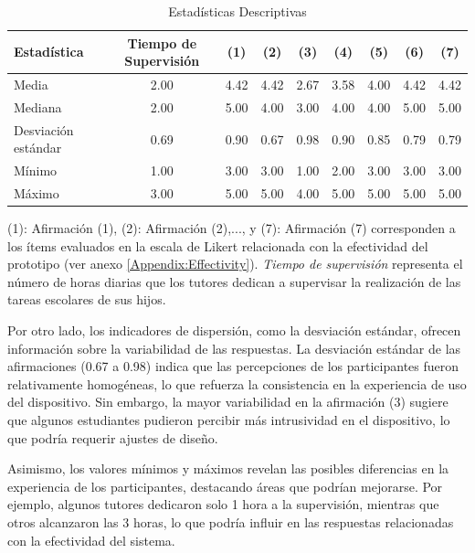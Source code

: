 				\begin{table}[h!]
				\centering
				\caption{Estadísticas Descriptivas}
				\begin{tabularx}{0.85\textwidth}{Xcccccccc}
					\toprule
					\textbf{Estadística} & \textbf{Tiempo de Supervisión} & \textbf{(1)} & \textbf{(2)} & \textbf{(3)} & \textbf{(4)} & \textbf{(5)} & \textbf{(6)} & \textbf{(7)} \\
					\midrule
					Media & 2.00 & 4.42 & 4.42 & 2.67 & 3.58 & 4.00 & 4.42 & 4.42 \\
					Mediana & 2.00 & 5.00 & 4.00 & 3.00 & 4.00 & 4.00 & 5.00 & 5.00 \\
					Desviación estándar & 0.69 & 0.90 & 0.67 & 0.98 & 0.90 & 0.85 & 0.79 & 0.79 \\
					Mínimo & 1.00 & 3.00 & 3.00 & 1.00 & 2.00 & 3.00 & 3.00 & 3.00 \\
					Máximo & 3.00 & 5.00 & 5.00 & 4.00 & 5.00 & 5.00 & 5.00 & 5.00 \\
					\bottomrule
				\end{tabularx}
				\label{table:DescriptiveStatistics}
				\vspace{0.3em} %
				\parbox{0.85\textwidth}{\footnotesize
					(1): Afirmación (1), (2): Afirmación (2),..., y (7): Afirmación (7) corresponden a los ítems evaluados en la escala de Likert relacionada con la efectividad del prototipo (ver anexo \ref{Appendix:Effectivity}). \textit{Tiempo de supervisión} representa el número de horas diarias que los tutores dedican a supervisar la realización de las tareas escolares de sus hijos.
				}
				\end{table}
				
				Por otro lado, los indicadores de dispersión, como la desviación estándar, ofrecen información sobre la variabilidad de las respuestas. La desviación estándar de las afirmaciones (0.67 a 0.98) indica que las percepciones de los participantes fueron relativamente homogéneas, lo que refuerza la consistencia en la experiencia de uso del dispositivo. Sin embargo, la mayor variabilidad en la afirmación (3) sugiere que algunos estudiantes pudieron percibir más intrusividad en el dispositivo, lo que podría requerir ajustes de diseño.
				
				Asimismo, los valores mínimos y máximos revelan las posibles diferencias en la experiencia de los participantes, destacando áreas que podrían mejorarse. Por ejemplo, algunos tutores dedicaron solo 1 hora a la supervisión, mientras que otros alcanzaron las 3 horas, lo que podría influir en las respuestas relacionadas con la efectividad del sistema.
				
